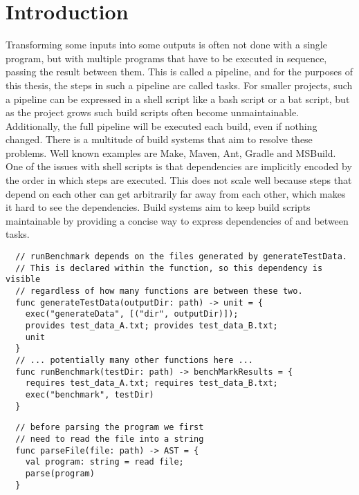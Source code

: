 
\chapter{Introduction}
\label{sec:introduction}

Transforming some inputs into some outputs is often not done with a single program, but with multiple programs that have to be executed in sequence, passing the result between them.
This is called a pipeline, and for the purposes of this thesis, the steps in such a pipeline are called tasks.
For smaller projects, such a pipeline can be expressed in a shell script like a bash script or a bat script, but as the project grows such build scripts often become unmaintainable.\autocites{Hatch2018}{Moodie2006}
Additionally, the full pipeline will be executed each build, even if nothing changed.
There is a multitude of build systems that aim to resolve these problems.
Well known examples are Make, Maven, Ant, Gradle and MSBuild.\missingref
One of the issues with shell scripts is that dependencies are implicitly encoded by the order in which steps are executed.
This does not scale well because steps that depend on each other can get arbitrarily far away from each other, which makes it hard to see the dependencies.
Build systems aim to keep build scripts maintainable by providing a concise way to express dependencies of and between tasks.
\begin{lstlisting}
  // runBenchmark depends on the files generated by generateTestData.
  // This is declared within the function, so this dependency is visible
  // regardless of how many functions are between these two.
  func generateTestData(outputDir: path) -> unit = {
    exec("generateData", [("dir", outputDir)]);
    provides test_data_A.txt; provides test_data_B.txt;
    unit
  }
  // ... potentially many other functions here ...
  func runBenchmark(testDir: path) -> benchMarkResults = {
    requires test_data_A.txt; requires test_data_B.txt;
    exec("benchmark", testDir)
  }
\end{lstlisting}
\begin{lstlisting}
  // before parsing the program we first 
  // need to read the file into a string
  func parseFile(file: path) -> AST = {
    val program: string = read file;
    parse(program)
  }
\end{lstlisting}
